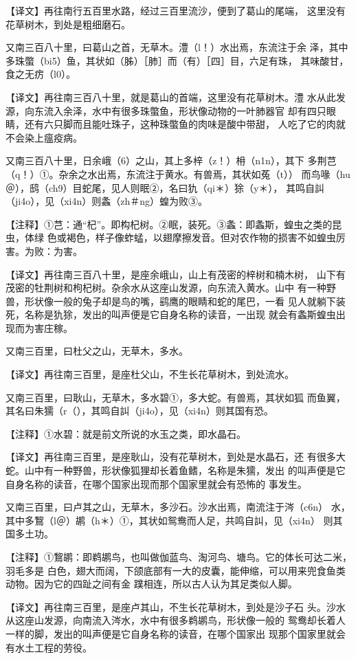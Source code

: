 \documentclass[a4paper,12pt,UTF8,twoside]{ctexbook}
\begin{document}
【译文】再往南行五百里水路，经过三百里流沙，便到了葛山的尾端， 这里没有花草树木，到处是粗细磨石。

又南三百八十里，曰葛山之首，无草木。澧（l！）水出焉，东流注于余 泽，其中多珠蟞（bi5）鱼，其状如（胏）［肺］而（有）［四］目，六足有珠， 其味酸甘，食之无疠（l0）。

【译文】再往南三百八十里，就是葛山的首端，这里没有花草树木。澧 水从此发源，向东流入余泽，水中有很多珠蟞鱼，形状像动物的一叶肺器官 却有四只眼睛，还有六只脚而且能吐珠子，这种珠蟞鱼的肉味是酸中带甜， 人吃了它的肉就不会染上瘟疫病。

又南三百八十里，日余峨（6）之山，其上多梓（z！）枏（n1n），其下 多荆芑（q！）①。杂余之水出焉，东流注于黄水。有兽焉，其状如菟（t）） 而鸟喙（hu＠），鸱（ch9）目蛇尾，见人则眠②，名曰犰（qi＊）狳（y＊）， 其鸣自訆（ji4o），见（xi4n）则螽（zh＃ng）蝗为败③。

【注释】①芑：通“杞”。即构杞树。②眠，装死。③螽：即螽斯，蝗虫之类的昆虫，体绿 色或褐色，样子像蚱蜢，以翅摩擦发音。但对农作物的损害不如蝗虫厉害。为败：为害。

【译文】再往南三百八十里，是座余峨山，山上有茂密的梓树和楠木树， 山下有茂密的牡荆树和枸杞树。杂余水从这座山发源，向东流入黄水。山中 有一种野兽，形状像一般的兔子却是鸟的嘴，鹞鹰的眼睛和蛇的尾巴，一看 见人就躺下装死，名称是犰狳，发出的叫声便是它自身名称的读音，一出现 就会有螽斯蝗虫出现而为害庄稼。

又南三百里，曰杜父之山，无草木，多水。

【译文】再往南三百里，是座杜父山，不生长花草树木，到处流水。

又南三百里，曰耿山，无草木，多水碧①，多大蛇。有兽焉，其状如狐 而鱼翼，其名曰朱獳（r（），其鸣自訆（ji4o），见（xi4n）则其国有恐。

【注释】①水碧：就是前文所说的水玉之类，即水晶石。

【译文】再往南三百里，是座耿山，没有花草树木，到处是水晶石，还 有很多大蛇。山中有一种野兽，形状像狐狸却长着鱼鳍，名称是朱獳，发出 的叫声便是它自身名称的读音，在哪个国家出现而那个国家里就会有恐怖的 事发生。

又南三百里，曰卢其之山，无草木，多沙石。沙水出焉，南流注于涔（c6n） 水，其中多鵹（l＠）鹕（h＊）①，其状如鸳鸯而人足，共鸣自訆，见（xi4n） 则其国多土功。

【注释】①鵹鹕：即鹈鹕鸟，也叫做伽蓝鸟、淘河鸟、塘鸟。它的体长可达二米，羽毛多是 白色，翅大而阔，下颌底部有一大的皮囊，能伸缩，可以用来兜食鱼类动物。因为它的四趾之间有金 蹼相连，所以古人认为其足类似人脚。

【译文】再往南三百里，是座卢其山，不生长花草树木，到处是沙子石 头。沙水从这座山发源，向南流入涔水，水中有很多鹈鹕鸟，形状像一般的 鸳鸯却长着人一样的脚，发出的叫声便是它自身名称的读音，在哪个国家出 现那个国家里就会有水土工程的劳役。
\end{document}

